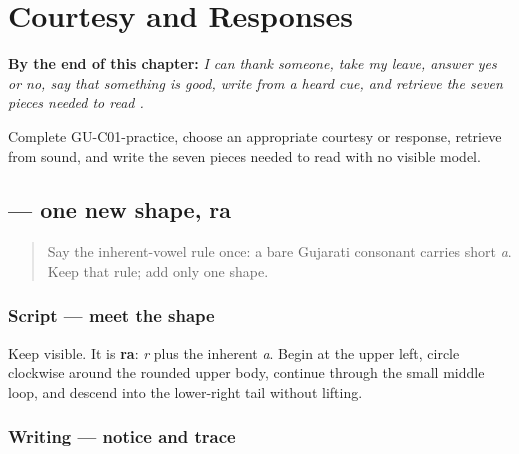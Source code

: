 
\chapter{Courtesy and Responses}
\label{ch:greetings}

\begin{chapteropening}
\textbf{By the end of this chapter:} \emph{I can thank someone, take my leave, answer yes or no, say that something is good, write  from a heard cue, and retrieve the seven pieces needed to read .}

Complete GU-C01-practice, choose an appropriate courtesy or response, retrieve  from sound, and write the seven pieces needed to read  with no visible model.
\end{chapteropening}

\section[\texorpdfstring{\gu{ર} (ra)}{ર (ra)}]{ — one new shape, ra}

\label{lesson:GU-W02-ra}



\begin{quote}
Say the inherent-vowel rule once: a bare Gujarati consonant carries short \emph{a}. Keep that rule; add only one shape.
\end{quote}

\subsection*{Script — meet the shape}
Keep \textbf{} visible. It is \textbf{ra}: \emph{r} plus the inherent \emph{a}. Begin at the upper left, circle clockwise around the rounded upper body, continue through the small middle loop, and descend into the lower-right tail without lifting.

\subsection*{Writing — notice and trace}

